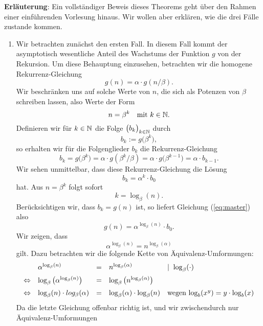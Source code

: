 \textbf{Erl\"auterung}:
Ein vollst\"andiger Beweis dieses Theorems geht \"uber den Rahmen einer einf\"uhrenden Vorlesung hinaus.
Wir wollen aber erkl\"aren, wie die drei F\"alle zustande kommen.
\begin{enumerate}
\item Wir betrachten zun\"achst den ersten Fall.  In diesem Fall kommt der asymptotisch 
wesentliche Anteil des Wachstums der Funktion $g$ von der Rekursion. 
Um diese Behauptung einzusehen, betrachten wir die homogene Rekurrenz-Gleichung
\[ g(n) = \alpha \cdot g\left(n/\beta\right). \]
Wir beschr\"anken uns auf solche Werte von $n$, die sich als Potenzen von $\beta$ schreiben
lassen, also Werte der Form 
\[ n = \beta^k \quad \mbox{mit $k\in{\mathbb N}$.} \]
Definieren wir f\"ur $k \in {\mathbb N}$ die Folge $\bigl(b_k\bigr)_{k\in{\mathbb N}}$ durch
\[ b_k := g\bigl(\beta^k\bigr), \]
so erhalten wir f\"ur die Folgenglieder $b_k$ die Rekurrenz-Gleichung 
\[
     b_k = g\bigl(\beta^k\bigr) = \alpha \cdot g\left( \beta^k/\beta \right) 
   = \alpha \cdot g\bigl(\beta^{k-1}\bigr) = \alpha \cdot b_{k-1}.
\]
Wir sehen unmittelbar, dass diese Rekurrenz-Gleichung die L\"osung 
\begin{equation}
  \label{eq:master}
  b_k = \alpha^k \cdot b_0   
\end{equation}
hat.  Aus $n = \beta^k$ folgt sofort 
\[  k = \log_\beta(n). \]
Ber\"ucksichtigen wir, dass $b_k = g(n)$ ist, so liefert Gleichung (\ref{eq:master}) also 
\begin{equation}
  \label{eq:master2}
   g(n) = \alpha^{\log_\beta(n)} \cdot b_0.   
\end{equation}
Wir zeigen, dass
\begin{equation}
  \label{eq:master1}
  \alpha^{\log_\beta(n)} = n^{\log_\beta(\alpha)} 
\end{equation}
gilt.  Dazu betrachten wir die folgende Kette von \"Aquivalenz-Umformungen:
\[ 
\begin{array}[t]{llcll}
                & \alpha^{\log_\beta(n)} & = & n^{\log_\beta(\alpha)} & \mid\; \log_\beta(\cdot)  \\[0.2cm]
\Leftrightarrow & \log_\beta\left(\alpha^{\log_\beta(n)}\right) 
                  & = & \log_\beta\left(n^{\log_\beta(\alpha)}\right) \\[0.2cm]
\Leftrightarrow & \log_\beta(n) \cdot log_\beta(\alpha) 
                  & = & \log_\beta(\alpha) \cdot \log_\beta(n) & 
                  \mbox{wegen $\log_b(x^y) = y \cdot \log_b(x)$}
\end{array}
\]
Da die letzte Gleichung offenbar richtig ist, und wir zwischendurch nur \"Aquivalenz-Umformungen

\end{enumerate}
